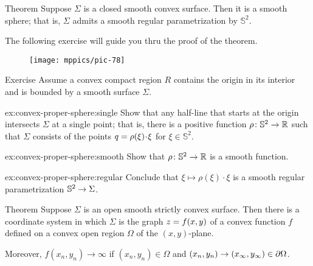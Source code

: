 \begin{thm}{Theorem}\label{thm:convex-closed}
Suppose $\Sigma$ is a closed smooth convex surface.
Then it is a smooth sphere; that is, $\Sigma$ admits a smooth regular parametrization by $\mathbb{S}^2$.\end{thm}

The following exercise will guide you thru the proof of the theorem.

{

\begin{wrapfigure}{r}{33 mm}
\vskip-0mm
\centering
\texttt{[image: mppics/pic-78]}
\end{wrapfigure}

\begin{thm}{Exercise}\label{ex:convex-proper-sphere}
Assume a convex compact region $R$ contains the origin in its interior and is bounded by a smooth surface $\Sigma$.

\begin{subthm}{ex:convex-proper-sphere:single}
Show that any half-line that starts at the origin intersects $\Sigma$ at a single point;
that is, there is a positive function $\rho\:\mathbb{S}^2\z\to\RR$ such that $\Sigma$ consists of the points $q\z=\rho(\xi)\cdot \xi$ for $\xi\in \mathbb{S}^2$.
\end{subthm}

\begin{subthm}{ex:convex-proper-sphere:smooth}
Show that $\rho\colon\mathbb{S}^2\to\mathbb{R}$ is a smooth function.
\end{subthm}

\begin{subthm}{ex:convex-proper-sphere:regular}
Conclude that $\xi\mapsto \rho(\xi)\cdot \xi$ is a smooth regular parametrization $\mathbb{S}^2\z\to \Sigma$.
\end{subthm}

\end{thm}

\begin{thm}{Theorem}\label{thm:convex-open}
Suppose $\Sigma$ is an open smooth strictly convex surface.
Then there is a coordinate system in which $\Sigma$ is the graph $z\z=f(x,y)$ of a convex function $f$ defined on a convex open region $\Omega$ of the $(x,y)$-plane.

Moreover, $f(x_n,y_n)\to\infty$ if $(x_n,y_n)\in\Omega$ and $(x_n,y_n)\to(x_\infty,y_\infty)\z\in \partial\Omega$.

\end{thm}

}
